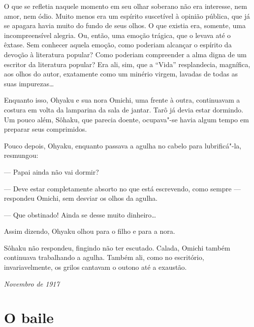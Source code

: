 O que se refletia naquele momento em seu olhar soberano não era
interesse, nem amor, nem ódio. Muito menos era um espírito suscetível à
opinião pública, que já se apagara havia muito do fundo de seus olhos.
O que existia era, somente, uma incompreensível alegria. Ou, então, uma
emoção trágica, que o levava até o êxtase. Sem conhecer aquela emoção,
como poderiam alcançar o espírito da devoção à literatura popular? Como
poderiam compreender a alma digna de um escritor da literatura popular?
Era ali, sim, que a ``Vida'' resplandecia, magnífica, aos olhos do autor,
exatamente como um minério virgem, lavadas de todas as suas
impurezas\ldots{}

Enquanto isso, Ohyaku e sua nora Omichi, uma frente à outra, continuavam
a costura em volta da lamparina da sala de jantar. Tarô já devia estar
dormindo. Um pouco além, Sôhaku, que parecia doente, ocupava"-se havia
algum tempo em preparar seus comprimidos.

Pouco depois, Ohyaku, enquanto passava a agulha no cabelo para
lubrificá"-la, resmungou:

--- Papai ainda não vai dormir?

--- Deve estar completamente absorto no que está escrevendo, como sempre 
--- respondeu Omichi, sem desviar os olhos da agulha.

--- Que obstinado! Ainda se desse muito dinheiro\ldots{}

Assim dizendo, Ohyaku olhou para o filho e para a nora. 

Sôhaku não respondeu, fingindo não ter escutado. Calada, Omichi também
continuava trabalhando a agulha. Também ali, como no escritório,
invariavelmente, os grilos cantavam o outono até a exaustão.

\begin{flushright}
\textit{Novembro de 1917}\\  
\end{flushright}


\chapter{O baile}

\sectionitem

